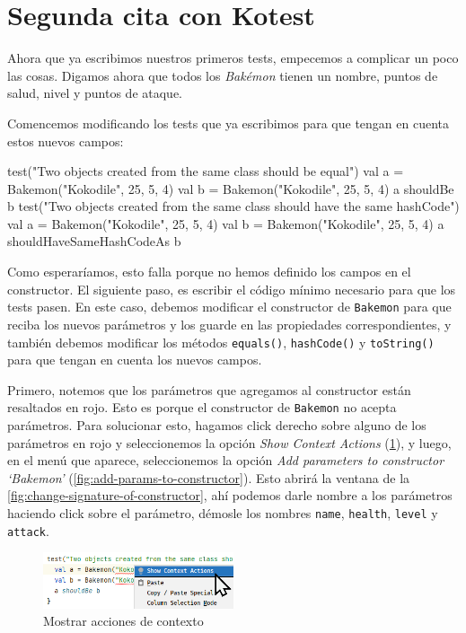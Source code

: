 \section{Segunda cita con Kotest}
\label{sec:kotest-2}
  
  Ahora que ya escribimos nuestros primeros tests, empecemos a complicar un poco las cosas.
  Digamos ahora que todos los \textit{Bakémon} tienen un nombre, puntos de salud, nivel y puntos de
  ataque.

  Comencemos modificando los tests que ya escribimos para que tengan en cuenta estos nuevos campos:

  \begin{kotlin}
    test("Two objects created from the same class should be equal") {
      val a = Bakemon("Kokodile", 25, 5, 4)
      val b = Bakemon("Kokodile", 25, 5, 4)
      a shouldBe b
    }
    test("Two objects created from the same class should have the same hashCode") {
      val a = Bakemon("Kokodile", 25, 5, 4)
      val b = Bakemon("Kokodile", 25, 5, 4)
      a shouldHaveSameHashCodeAs b
    }
  \end{kotlin}

  Como esperaríamos, esto falla porque no hemos definido los campos en el constructor.
  El siguiente paso, es escribir el código mínimo necesario para que los tests pasen.
  En este caso, debemos modificar el constructor de \texttt{Bakemon} para que reciba los nuevos
  parámetros y los guarde en las propiedades correspondientes, y también debemos modificar los 
  métodos \texttt{equals()}, \texttt{hashCode()} y \texttt{toString()} para que tengan en cuenta
  los nuevos campos.
  
  Primero, notemos que los parámetros que agregamos al constructor están resaltados en rojo.
  Esto es porque el constructor de \texttt{Bakemon} no acepta parámetros.
  Para solucionar esto, hagamos click derecho sobre alguno de los parámetros en rojo y seleccionemos
  la opción \textit{Show Context Actions} (\cref{fig:show-context-actions}), y luego, en el menú que
  aparece, seleccionemos la opción \textit{Add parameters to constructor `Bakemon'} 
  (\cref{fig:add-params-to-constructor}).
  Esto abrirá la ventana de la \cref{fig:change-signature-of-constructor}, ahí podemos darle nombre
  a los parámetros haciendo click sobre el parámetro, démosle los nombres \texttt{name}, 
  \texttt{health}, \texttt{level} y \texttt{attack}.

  \begin{figure}[ht!]
    \centering
    \includegraphics[width=0.5\textwidth]{img/oop/tdd/kotest_2/show_context_actions.png}
    \caption{Mostrar acciones de contexto}
    \label{fig:show-context-actions}
  \end{figure}

